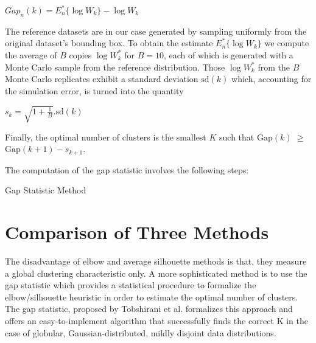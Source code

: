 $Gap_n(k) = E_n^{*}\{\log W_k\} - \log W_k$


The reference datasets are in our case generated by sampling uniformly from the original dataset’s bounding box.
To obtain the estimate $E_n^*\{\log W_k\}$ we compute the average of $B$ copies $\log W^*_k$ for $B=10$, each of
which is generated with a Monte Carlo sample from the reference distribution. Those $\log W^*_k$ from the $B$
Monte Carlo replicates exhibit a standard deviation $\mathrm{sd}(k)$ which, accounting for the simulation error,
is turned into the quantity

$s_k = \sqrt{1+\frac{1}{B}} . \mathrm{sd}(k)$

Finally, the optimal number of clusters is the smallest $K$ such that
$\mathrm{Gap}(k)$ $\geq$ $\mathrm{Gap}(k+1) - s_{k+1}$.

The computation of the gap statistic involves the following steps:

\begin{algorithm}
  \caption{Gap Statistic Method}
  \label{alg3}
  \begin{algorithmic}
    
  \end{algorithmic}
\end{algorithm}

\section{Comparison of Three Methods}
The disadvantage of elbow and average silhouette methods is that, they measure a global clustering
characteristic only. A more sophisticated method is to use the gap statistic which provides a statistical
procedure to formalize the elbow/silhouette heuristic in order to estimate the optimal number of clusters.
The gap statistic, proposed by Tobshirani et al. formalizes this approach and offers an easy-to-implement
algorithm that successfully finds the correct K in the case of globular, Gaussian-distributed, mildly
disjoint data distributions.

\endinput
